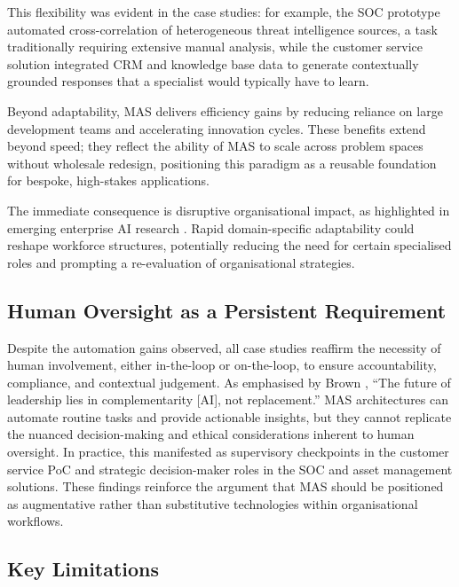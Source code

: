 \documentclass{article}
\begin{document}
This flexibility was evident in the case studies: for example, the SOC prototype automated cross-correlation of heterogeneous threat intelligence sources, a task traditionally requiring extensive manual analysis, while the customer service solution integrated CRM and knowledge base data to generate contextually grounded responses that a specialist would typically have to learn.

Beyond adaptability, MAS delivers efficiency gains by reducing reliance on large development teams and accelerating innovation cycles. These benefits extend beyond speed; they reflect the ability of MAS to scale across problem spaces without wholesale redesign, positioning this paradigm as a reusable foundation for bespoke, high-stakes applications.

The immediate consequence is disruptive organisational impact, as highlighted in emerging enterprise AI research \cite{puavualoaia2023artificial}. Rapid domain-specific adaptability could reshape workforce structures, potentially reducing the need for certain specialised roles and prompting a re-evaluation of organisational strategies.

\subsection{Human Oversight as a Persistent Requirement}

Despite the automation gains observed, all case studies reaffirm the necessity of human involvement, either in-the-loop or on-the-loop, to ensure accountability, compliance, and contextual judgement. As emphasised by Brown \cite{brown2024impactai}, “The future of leadership lies in complementarity [AI], not replacement.” MAS architectures can automate routine tasks and provide actionable insights, but they cannot replicate the nuanced decision-making and ethical considerations inherent to human oversight. In practice, this manifested as supervisory checkpoints in the customer service PoC and strategic decision-maker roles in the SOC and asset management solutions. These findings reinforce the argument that MAS should be positioned as augmentative rather than substitutive technologies within organisational workflows.

\subsection{Key Limitations}
\end{document}
